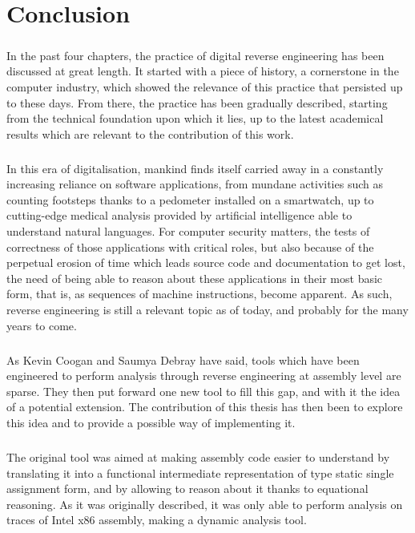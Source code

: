 \chapter{Conclusion} \label{chapter:conclusion}
\paragraph{}
In the past four chapters, the practice of digital reverse engineering has been discussed at great length. It started with a piece of history, a cornerstone in the computer industry, which showed the relevance of this practice that persisted up to these days. From there, the practice has been gradually described, starting from the technical foundation upon which it lies, up to the latest academical results which are relevant to the contribution of this work.

\paragraph{}
In this era of digitalisation, mankind finds itself carried away in a constantly increasing reliance on software applications, from mundane activities such as counting footsteps thanks to a pedometer installed on a smartwatch, up to cutting-edge medical analysis provided by artificial intelligence able to understand natural languages. For computer security matters, the tests of correctness of those applications with critical roles, but also because of the perpetual erosion of time which leads source code and documentation to get lost, the need of being able to reason about these applications in their most basic form, that is, as sequences of machine instructions, become apparent. As such, reverse engineering is still a relevant topic as of today, and probably for the many years to come. 

\paragraph{}
As Kevin Coogan and Saumya Debray have said, tools which have been engineered to perform analysis through reverse engineering at assembly level are sparse. They then put forward one new tool to fill this gap, and with it the idea of a potential extension. The contribution of this thesis has then been to explore this idea and to provide a possible way of implementing it.

\paragraph{}
The original tool was aimed at making assembly code easier to understand by translating it into a functional intermediate representation of type static single assignment form, and by allowing to reason about it thanks to equational reasoning. As it was originally described, it was only able to perform analysis on traces of Intel x86 assembly, making a dynamic analysis tool.

